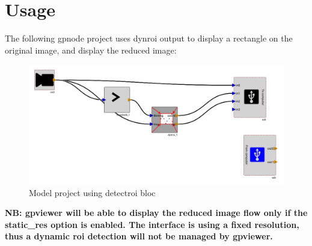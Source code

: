\documentclass[12pt,a4paper]{article}
\begin{document}
\section*{Usage}
The following gpnode project uses dynroi output to display a rectangle on the original image, and display the reduced image:
\begin{figure}[h!]
\centering
\label{dynroiUsage}
\caption{Model project using detectroi bloc}
\includegraphics[width=14cm]{dynroiUsage.png}
\end{figure}

\textbf{NB: gpviewer will be able to display the reduced image flow only if the static\_res option is enabled. The interface is using a fixed resolution, thus a dynamic roi detection will not be managed by gpviewer.}
\end{document}

